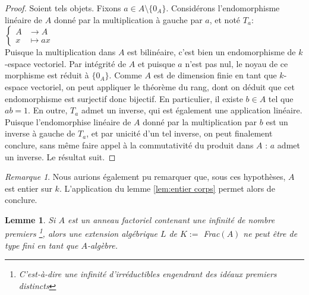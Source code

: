 \documentclass[10pt, twoside]{article}
\theoremstyle{plain}
\theoremstyle{definition}
\theoremstyle{plain}
\theoremstyle{plain}
\newtheorem{lemma}[theorem]{Lemme}
\theoremstyle{definition}
\theoremstyle{remark}
\newtheorem*{remark}{Remarque}
\begin{document}
\begin{proof}
    Soient tels objets.
    Fixons $a \in A \setminus \{0_A\}$. Considérons l'endomorphisme linéaire de $A$ donné par la multiplication à gauche par $a$, et noté $T_a$: 
    $\begin{cases}
        A &\longrightarrow A \\
        x &\longmapsto ax
    \end{cases}$\\
    Puisque la multiplication dans $A$ est bilinéaire, c'est bien un endomorphisme de $k$-espace vectoriel. Par intégrité de $A$ et puisque $a$ n'est pas nul, le noyau de ce morphisme est réduit à $\{ 0_A \}$. Comme $A$ est de dimension finie en tant que $k$-espace vectoriel, on peut appliquer le théorème du rang, dont on déduit que cet endomorphisme est surjectif donc bijectif. En particulier, il existe $b \in A$ tel que $ab = 1$. En outre, $T_a$ admet un inverse, qui est également une application linéaire. Puisque l'endomorphise linéaire de $A$ donné par la multiplication par $b$ est un inverse à gauche de $T_a$, et par unicité d'un tel inverse, on peut finalement conclure, sans même faire appel à la commutativité du produit dans $A$ : $a$ admet un inverse. Le résultat suit.
\end{proof}

\begin{remark}
    Nous aurions également pu remarquer que, sous ces hypothèses, $A$ est entier sur $k$. L'application du lemme \ref{lem:entier corps} permet alors de conclure.
\end{remark}

\begin{lemma}\label{lem:ann fact inf premier}
    Si $A$ est un anneau factoriel contenant une infinité de nombre premiers \footnote{C'est-à-dire une infinité d'irréductibles engendrant des idéaux premiers distincts}, alors une extension algébrique $L$ de $K :=$ Frac$(A)$ ne peut être de type fini en tant que $A$-algèbre.
\end{lemma}
\end{document}
